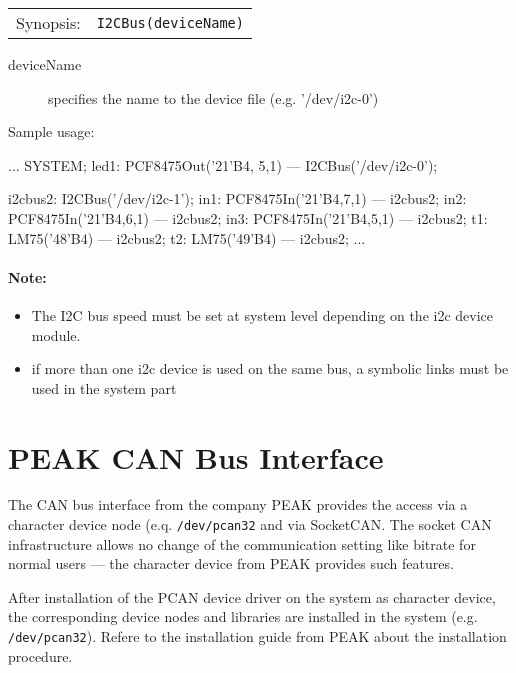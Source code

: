 \begin{tabular}{ll}
Synopsis: & \verb|I2CBus(deviceName)|\\ 
\end{tabular}

\begin{description}
\item[deviceName] specifies the name to the device file (e.g. '/dev/i2c-0')
\end{description}

Sample usage:
\begin{PEARLCode}
...
SYSTEM;
   led1: PCF8475Out('21'B4, 5,1) --- I2CBus('/dev/i2c-0');

   i2cbus2: I2CBus('/dev/i2c-1');
   in1: PCF8475In('21'B4,7,1) --- i2cbus2;
   in2: PCF8475In('21'B4,6,1) --- i2cbus2;
   in3: PCF8475In('21'B4,5,1) --- i2cbus2;
   t1: LM75('48'B4) --- i2cbus2;
   t2: LM75('49'B4) --- i2cbus2;
...
\end{PEARLCode}

\paragraph{Note:}
\begin{itemize}
\item The I2C bus speed must be set at system level depending on the 
i2c device module.
\item if more than one i2c device is used on the same bus, a symbolic
   links must be used in the system part
\end{itemize}

\section{PEAK CAN Bus Interface}
The CAN bus interface from the company PEAK provides the access via a character 
device node (e.q. \texttt{/dev/pcan32} and via SocketCAN.
The socket CAN infrastructure allows no change of the communication setting
like bitrate for normal users --- the character device from PEAK provides
such features. 

After installation of the PCAN device driver on the system as character 
device, the corresponding device nodes and libraries are installed 
in the system (e.g. \verb|/dev/pcan32|). Refere to the installation guide 
from PEAK about the installation procedure.


